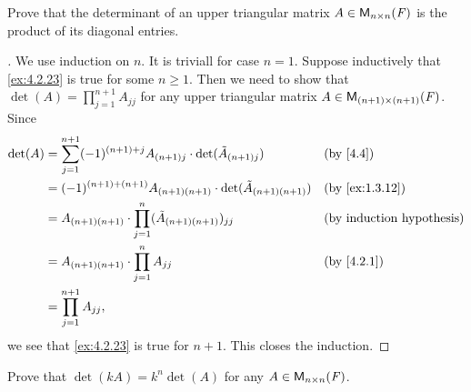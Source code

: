 \exercisesection

\setcounter{ex}{22}
\begin{ex}\label{ex:4.2.23}
  Prove that the determinant of an upper triangular matrix \(A \in \ms[n][n][\F]\) is the product of its diagonal entries.
\end{ex}

\begin{proof}[]
  We use induction on \(n\).
  It is triviall for case \(n = 1\).
  Suppose inductively that \cref{ex:4.2.23} is true for some \(n \geq 1\).
  Then we need to show that \(\det(A) = \prod_{j = 1}^{n + 1} A_{j j}\) for any upper triangular matrix \(A \in \ms[(n + 1)][(n + 1)][\F]\).
  Since
  \begin{align*}
    \det(A) & = \sum_{j = 1}^{n + 1} (-1)^{(n + 1) + j} A_{(n + 1) j} \cdot \det(\tilde{A}_{(n + 1) j}) &  & \by{4.4}                         \\
            & = (-1)^{(n + 1) + (n + 1)} A_{(n + 1) (n + 1)} \cdot \det(\tilde{A}_{(n + 1) (n + 1)})    &  & \by{ex:1.3.12}                   \\
            & = A_{(n + 1) (n + 1)} \cdot \prod_{j = 1}^n (\tilde{A}_{(n + 1) (n + 1)})_{j j}           &  & \text{(by induction hypothesis)} \\
            & = A_{(n + 1) (n + 1)} \cdot \prod_{j = 1}^n A_{j j}                                       &  & \by{4.2.1}                       \\
            & = \prod_{j = 1}^{n + 1} A_{j j},
  \end{align*}
  we see that \cref{ex:4.2.23} is true for \(n + 1\).
  This closes the induction.
\end{proof}

\setcounter{ex}{24}
\begin{ex}\label{ex:4.2.25}
  Prove that \(\det(kA) = k^n \det(A)\) for any \(A \in \ms[n][n][\F]\).
\end{ex}

